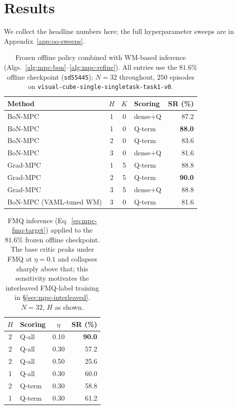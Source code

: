 \section{Results}
\label{sec:mpc-results}

We collect the headline numbers here; the full hyperparameter sweeps are in Appendix~\ref{app:oo-sweeps}.

\begin{table}[h]
\centering
\caption{Frozen offline policy combined with WM-based inference
   (Algs.~\ref{alg:mpc-bon}--\ref{alg:mpc-refine}). All entries use
   the $81.6\%$ offline checkpoint (\texttt{sd55445}); $N = 32$ throughout, $250$ episodes on
   \texttt{visual-cube-single-singletask-task1-v0}.}
\label{tab:mpc-frozen}
\begin{tabular}{l c c l r}
\toprule
Method & $H$ & $K$ & Scoring & SR (\%) \\
\midrule
BoN-MPC                 & 1 & 0 & dense$+$Q & 87.2 \\
BoN-MPC                 & 1 & 0 & Q-term    & \textbf{88.0} \\
BoN-MPC                 & 2 & 0 & Q-term    & 83.6 \\
BoN-MPC                 & 3 & 0 & dense$+$Q & 81.6 \\
\midrule
Grad-MPC                & 1 & 5 & Q-term    & 88.8 \\
Grad-MPC                & 2 & 5 & Q-term    & \textbf{90.0} \\
Grad-MPC                & 3 & 5 & dense$+$Q & 88.8 \\
\midrule
BoN-MPC (VAML-tuned WM) & 3 & 0 & Q-term    & 81.6 \\
\bottomrule
\end{tabular}
\end{table}

\begin{table}[h]
\centering
\caption{FMQ inference (Eq.~\eqref{eq:mpc-fmq-target}) applied to the
   $81.6\%$ frozen offline checkpoint. The base critic peaks under FMQ
   at $\eta = 0.1$ and collapses sharply above that; this sensitivity
   motivates the interleaved FMQ-label training in \S\ref{sec:mpc-interleaved}.
   $N = 32$, $H$ as shown.}
\label{tab:mpc-fmq-basepolicy}
\begin{tabular}{c l c r}
\toprule
$H$ & Scoring & $\eta$ & SR (\%) \\
\midrule
2 & Q-all  & 0.10 & \textbf{90.0} \\
2 & Q-all  & 0.30 & 57.2 \\
2 & Q-all  & 0.50 & 25.6 \\
1 & Q-all  & 0.30 & 60.0 \\
2 & Q-term & 0.30 & 58.8 \\
1 & Q-term & 0.30 & 61.2 \\
\bottomrule
\end{tabular}
\end{table}

